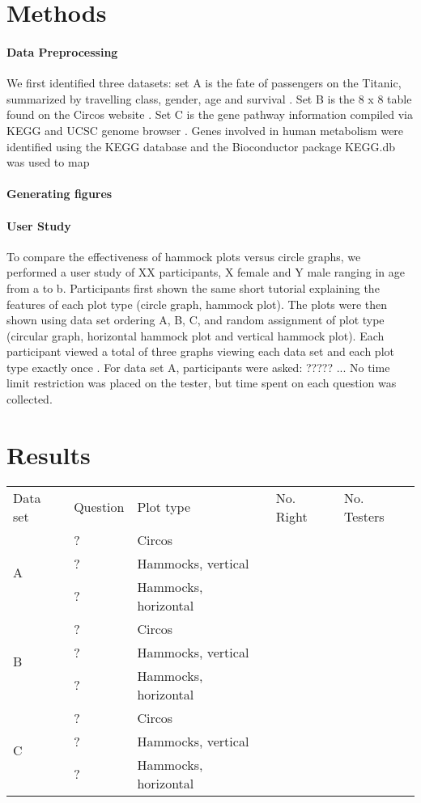 \documentclass{vgtc}                          %
\begin{document}
\section{Methods}
\paragraph{Data Preprocessing}
We first identified three datasets: set A is the fate of passengers on the Titanic, summarized by travelling class, gender, age and survival \cite{titanic}. Set B is the 8 x 8 table found on the Circos website \cite{circosdata}. Set C is the gene pathway information compiled via KEGG \cite{KEGG12} \cite{KEGG00} and UCSC genome browser \cite{ucsc02} \cite{ucsc10}. Genes involved in human metabolism were identified using the KEGG database and the Bioconductor package KEGG.db \cite{keggdb} was used to map

\paragraph{Generating figures}
\paragraph{User Study} To compare the effectiveness of hammock plots versus circle graphs, we performed a user study of XX participants, X female and Y male ranging in age from a to b.  Participants first shown the same short tutorial explaining the features of each plot type (circle graph, hammock plot). The plots were then shown using data set ordering A, B, C, and random assignment of plot type (circular graph, horizontal hammock plot and vertical hammock plot). Each participant viewed a total of three graphs viewing each data set and each plot type exactly once . For data set A, participants were asked: ????? ... No time limit restriction was placed on the tester, but time spent on each question was collected.

\section{Results}
\begin{table}[h]
\begin{tabular}{p{.5cm}p{2cm}lp{.6cm}p{.75cm}}
Data set & Question & Plot type & No. Right & No. Testers\\
\multirow{3}{*}{A} & ? & Circos & & \\
 & ? & Hammocks, vertical & & \\
 & ? & Hammocks, horizontal & & \\ 
\hline
\multirow{3}{*}{B} & ? & Circos & & \\
 & ? & Hammocks, vertical & & \\
 & ? & Hammocks, horizontal & & \\ 
\hline
\multirow{3}{*}{C} & ? & Circos & & \\
 & ? & Hammocks, vertical & & \\
 & ? & Hammocks, horizontal & & \\ 
\end{tabular}

\end{table}
\end{document}
